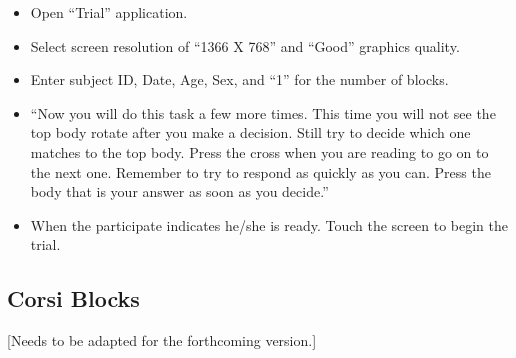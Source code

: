 \documentclass{article}
\begin{document}
\begin{itemize}
\item Open ``Trial'' application.

\item Select screen resolution of ``1366 X 768'' and ``Good'' graphics quality.

\item Enter subject ID, Date, Age, Sex, and ``1'' for the number of blocks.

\item ``Now you will do this task a few more times. This time you will not see the top body rotate after you make a decision. Still try to decide which one matches to the top body. Press the cross when you are reading to go on to the next one. Remember to try to respond as quickly as you can. Press the body that is your answer as soon as you decide.''

\item When the participate indicates he/she is ready.  Touch the screen to begin the trial.

\end{itemize}


\subsection{Corsi Blocks} %

[Needs to be adapted for the forthcoming version.]
\end{document}
